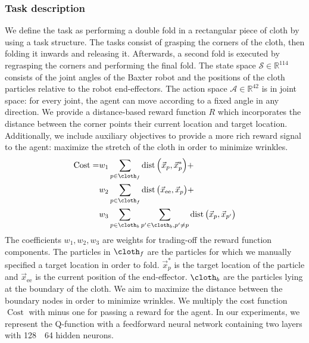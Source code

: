 \documentclass[\home/main.tex]{subfiles}
\begin{document}
\subsubsection{Task description}
We define the task as performing a double fold in a rectangular piece of cloth by using a task structure. The tasks consist of grasping the corners of the cloth, then folding it inwards and releasing it. Afterwards, a second fold is executed by regrasping the corners and performing the final fold.
The state space $\mathcal{S} \in \mathbb{R}^{114}$ consists of the joint angles of the Baxter robot and the positions of the cloth particles relative to the robot end-effectors.
The action space $\mathcal{A} \in \mathbb{R}^{42}$ is in joint space: for every joint, the agent can move according to a fixed angle in any direction.
We provide a distance-based reward function $R$ which incorporates the distance between the corner points their current location and target location. Additionally, we include auxiliary objectives to provide a more rich reward signal to the agent: maximize the stretch of the cloth in order to minimize wrinkles.
\begin{align} \label{eq:sim_cost_function}
    \operatorname{Cost} = & w_1 \sum_{p \in \cloth_f} \operatorname{dist}{\left( \vec{x}_p , \vec{x}_{p}^{*} \right)} + \nonumber                                            \\
                          & w_2 \sum_{p \in \cloth_f} \operatorname{dist}{\left( \vec{x}_{\text{ee}} , \vec{x}_{p} \right)} + \nonumber                                      \\
                          & w_3 \sum_{p \in \cloth_b} \sum_{p^{\prime} \in \cloth_b, p^{\prime} \neq p} \operatorname{dist}{\left( \vec{x}_p , \vec{x}_{p^{\prime}} \right)}
\end{align}
The coefficients $w_1,w_2, w_3$ are weights for trading-off the reward function components. The particles in $\cloth_f$ are the particles for which we manually specified a target location in order to fold. $\vec{x}_{p}^{*}$ is the target location of the particle and $\vec{x}_{\text{ee}}$ is the current position of the end-effector. $\cloth_b$ are the particles lying at the boundary of the cloth. We aim to maximize the distance between the boundary nodes in order to minimize wrinkles.
We multiply the cost function $\operatorname{Cost}$ with minus one for passing a reward for the agent.
In our experiments, we represent the Q-function with a feedforward neural network containing two layers with 128~\texttimes~64 hidden neurons.
\end{document}
